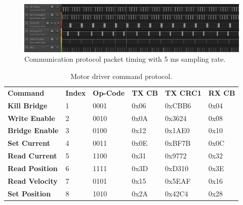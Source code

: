 \begin{figure}
\centering
\includegraphics[width=1\textwidth]{images/comms/pc-packet-timing-data} 
\caption{Communication protocol packet timing with 5 ms sampling rate.}
\label{fig:packet-timing.}
\end{figure}

\begin{table}
\centering
\begin{tabular}{llllll}
\textbf{Command}       & \textbf{Index} & \textbf{Op-Code} & \textbf{TX CB} & \textbf{TX CRC1} & \textbf{RX  CB} \\
\textbf{Kill Bridge}   & 1              & 0001             & 0x06           & 0xCBB6           & 0x04            \\
\textbf{Write Enable}  & 2              & 0010             & 0x0A           & 0x3624           & 0x08            \\
\textbf{Bridge Enable} & 3              & 0100             & 0x12           & 0x1AE0           & 0x10            \\
\textbf{Set Current}   & 4              & 0011             & 0x0E           & 0xBF7B           & 0x0C            \\
\textbf{Read Current}  & 5              & 1100             & 0x31           & 0x9772           & 0x32            \\
\textbf{Read Position} & 6              & 1111             & 0x3D           & 0xD310           & 0x3E            \\
\textbf{Read Velocity} & 7              & 0101             & 0x15           & 0x5EAF           & 0x16            \\
\textbf{Set Position}  & 8              & 1010             & 0x2A           & 0x42C4           & 0x28           
\end{tabular}
\caption{Motor driver command protocol.}
\label{tab:motor-driver-protocol}
\end{table}